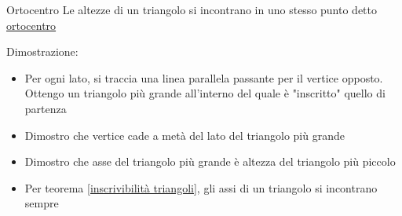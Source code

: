 \begin{teorema}{Ortocentro}
	Le altezze di un triangolo si incontrano in uno stesso punto detto \underline{ortocentro}
\end{teorema}
Dimostrazione:
\begin{itemize}
	\item Per ogni lato, si traccia una linea parallela passante per il vertice opposto. Ottengo un triangolo più grande all'interno del quale è "inscritto" quello di partenza
	\item Dimostro che vertice cade a metà del lato del triangolo più grande
	\item Dimostro che asse del triangolo più grande è altezza del triangolo più piccolo
	\item Per teorema \ref{inscrivibilità triangoli}, gli assi di un triangolo si incontrano sempre
\end{itemize}
